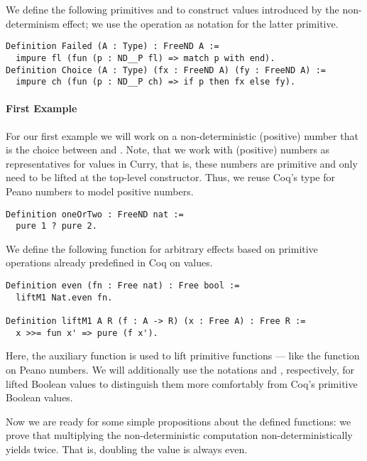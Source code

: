 We define the following primitives  and  to construct values introduced by the non-determinism effect; we use the operation  as notation for the latter primitive.

\begin{verbatim}
Definition Failed (A : Type) : FreeND A :=
  impure fl (fun (p : ND__P fl) => match p with end).
Definition Choice (A : Type) (fx : FreeND A) (fy : FreeND A) :=
  impure ch (fun (p : ND__P ch) => if p then fx else fy).
\end{verbatim}

\paragraph{First Example}
\label{par:firstNDExample}
For our first example we will work on a non-deterministic (positive) number that is the choice between  and .
Note, that we work with (positive) numbers as representatives for  values in Curry, that is, these numbers are primitive and only need to be lifted at the top-level constructor.
Thus, we reuse Coq's type for Peano numbers  to model positive numbers.

\begin{verbatim}
Definition oneOrTwo : FreeND nat :=
  pure 1 ? pure 2.
\end{verbatim}

We define the following function  for arbitrary effects based on primitive operations already predefined in Coq on  values.

\begin{verbatim}
Definition even (fn : Free nat) : Free bool :=
  liftM1 Nat.even fn.

Definition liftM1 A R (f : A -> R) (x : Free A) : Free R :=
  x >>= fun x' => pure (f x').
\end{verbatim}

Here, the auxiliary function  is used to lift primitive functions --- like the  function on Peano numbers.
We will additionally use the notations  and , respectively, for lifted Boolean values to distinguish them more comfortably from Coq's primitive Boolean values.

Now we are ready for some simple propositions about the defined functions: we prove that multiplying the non-deterministic computation  non-deterministically yields  twice.
That is, doubling the value  is always even.

